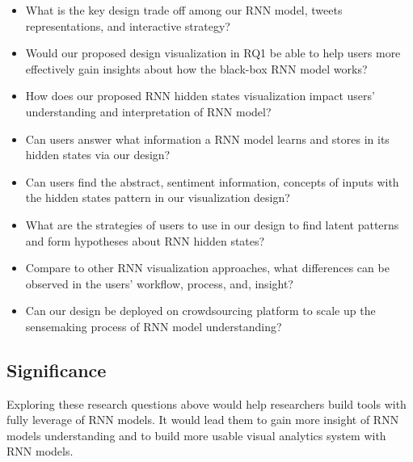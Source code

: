 \begin{itemize}

    \item What is the key design trade off among our RNN model, tweets representations, and interactive strategy?

    \item Would our proposed design visualization in RQ1 be able to help users more effectively gain insights about how the black-box RNN model works? 

    \item How does our proposed RNN hidden states visualization impact users’ understanding and interpretation of RNN model?
    
    \item Can users answer what information a RNN model learns and stores in its hidden states via our design?
    
    \item Can users find the abstract, sentiment information, concepts of inputs with the hidden states pattern in our visualization design?
    
    \item What are the strategies of users to use in our design to find latent patterns and form hypotheses about RNN hidden states?
    
    \item Compare to other RNN visualization approaches\cite{Strobelt2016}, what differences can be observed in the users’ workflow, process, and, insight?
    
    \item Can our design be deployed on crowdsourcing platform to scale up the sensemaking process of RNN model understanding?

\end{itemize}


\subsection{Significance}


Exploring these research questions above would help researchers build tools with fully leverage of RNN models. It would lead them to gain more insight of RNN models understanding and to build more usable visual analytics system with RNN models. 



